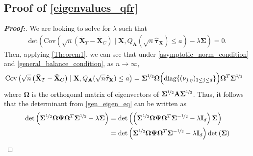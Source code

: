 \documentclass[11pt,twoside]{article}
\theoremstyle{definition}
\theoremstyle{remark}
\begin{document}
\subsection{Proof of \texorpdfstring{\cref{eigenvalues_qfr}}{Corollary 1}} \label{eigenvalues_qfr_proof}
\begin{proof}[\textbf{Proof:}] We are looking to solve for $\lambda$ such that
\begin{align} \label{gen_eigen_eq}
    \text{det}\left(\text{Cov}\left(\sqrt{n}\left(\bar{\mathbf{X}}_T - \bar{\mathbf{X}}_C\right) \mid \mathbf{X}, Q_\mathbf{A}(\sqrt{n} \widehat{\bm{\tau}}_{\mathbf{X}}) \leq a\right) - \lambda \mathbf{\Sigma} \right) = 0.
\end{align}
Then, applying \cref{Theorem1}, we can see that under \cref{asymptotic_norm_condition} and \cref{general_balance_condition}, as $n \to \infty$,
    \begin{align*}
        \text{Cov}\left(\sqrt{n}\left(\bar{\mathbf{X}}_T - \bar{\mathbf{X}}_C \right) \mid \mathbf{X}, Q_{\mathbf{A}}(\sqrt{n} \widehat{\bm{\tau}}_{\mathbf{X}}) \leq a \right) &= \mathbf{\Sigma}^{\nicefrac{1}{2}} \mathbf{\Omega} \Big( \text{diag}\{(\nu_{j, \eta})_{1 \leq j \leq d} \} \Big) \mathbf{\Omega}^T \mathbf{\Sigma}^{\nicefrac{1}{2}}
    \end{align*}
    where $\mathbf{\Omega}$ is the orthogonal matrix of eigenvectors of $\mathbf{\Sigma}^{\nicefrac{1}{2}} \mathbf{A} \mathbf{\Sigma}^{\nicefrac{1}{2}}$. Thus, it follows that the determinant from \cref{gen_eigen_eq} can be written as
    \begin{align*}
        \text{det}\left(\mathbf{\Sigma}^{\nicefrac{1}{2}} \mathbf{\Omega} \mathbf{\Psi} \mathbf{\Omega}^T \mathbf{\Sigma}^{\nicefrac{1}{2}} - \lambda \mathbf{\Sigma} \right) &= \text{det}\left( \left(\mathbf{\Sigma}^{\nicefrac{1}{2}} \mathbf{\Omega} \mathbf{\Psi} \mathbf{\Omega}^T \mathbf{\Sigma}^{-\nicefrac{1}{2}} - \lambda \mathbf{I}_d \right) \mathbf{\Sigma} \right) \\
        &=  \text{det}\left( \mathbf{\Sigma}^{\nicefrac{1}{2}} \mathbf{\Omega} \mathbf{\Psi} \mathbf{\Omega}^T \mathbf{\Sigma}^{-\nicefrac{1}{2}} - \lambda \mathbf{I}_d \right) \text{det}\left(\mathbf{\Sigma} \right)
    \end{align*}

\end{proof}
\end{document}
